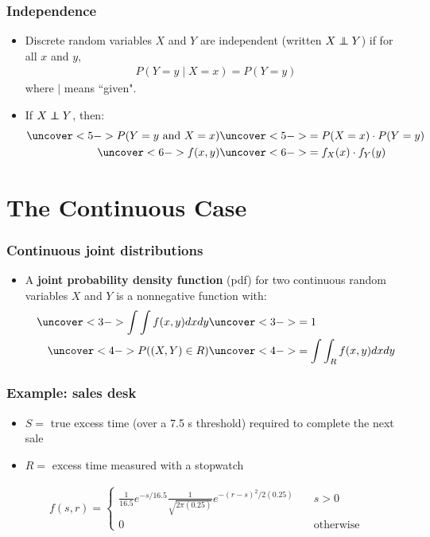 \documentclass[handout]{beamer}\usepackage{graphicx, color}
\newcommand\ind{\protect\mathpalette{\protect\independenT}{\perp}}
\def\independenT#1#2{\mathrel{\rlap{$#1#2$}\mkern2mu{#1#2}}}
\numberwithin{equation}{section}
\begin{document}
\begin{frame}
\frametitle{Independence}
\begin{itemize}
\pause \item Discrete random variables $X$ and $Y$ are independent (written $X \ind Y$) if for all $x$ and $y$,
\pause \begin{align*}
P(Y = y \mid X = x) = P(Y = y) 
\end{align*}
where $\mid$ means ``given".
\pause \item If $X \ind Y$, then:
\begin{align*}
\uncover<5->{P(Y = y \text{ and } X = x)} & \uncover<5->{= P(X = x) \cdot P(Y = y)} \\
\uncover<6->{f(x, y)} & \uncover<6->{= f_X(x) \cdot f_Y(y)}
\end{align*}
\end{itemize}
\end{frame}

\section{The Continuous Case}

\begin{frame}
\frametitle{Continuous joint distributions}
\begin{itemize}
\pause \item A {\bf joint probability density function} (pdf) for two continuous random variables $X$ and $Y$ is a nonnegative function with:
\begin{align*}
\uncover<3->{\int \int f(x,y) dx dy} & \uncover<3->{= 1} \\
\uncover<4->{P((X, Y) \in R)} & \uncover<4->{= \int \int_R f(x,y) dx dy}
\end{align*}
\end{itemize}
\end{frame}



\begin{frame}
\frametitle{Example: sales desk}
\begin{itemize}
\pause \item $S = $ true excess time (over a 7.5 s threshold) required to complete the next sale
\pause \item $R = $ excess time measured with a stopwatch
\end{itemize}

\pause \begin{align*}
f(s,r ) = \begin{cases}
\frac{1}{16.5} e^{-s/16.5} \frac{1}{\sqrt{2 \pi (0.25)}} e^{-(r - s)^2/2(0.25)} & \quad s > 0 \\
0 & \quad \text{otherwise}
\end{cases}
\end{align*}
\end{frame}
\end{document}
